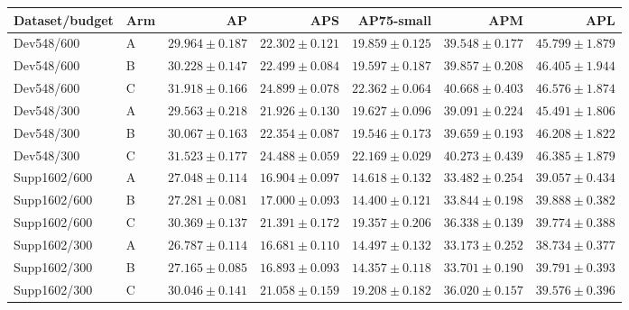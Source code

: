 \begin{tabular}{llrrrrr}
Dataset/budget & Arm & AP & APS & AP75-small & APM & APL \\
\hline
Dev548/600 & A & $29.964 \pm 0.187$ & $22.302 \pm 0.121$ & $19.859 \pm 0.125$ & $39.548 \pm 0.177$ & $45.799 \pm 1.879$ \\
Dev548/600 & B & $30.228 \pm 0.147$ & $22.499 \pm 0.084$ & $19.597 \pm 0.187$ & $39.857 \pm 0.208$ & $46.405 \pm 1.944$ \\
Dev548/600 & C & $31.918 \pm 0.166$ & $24.899 \pm 0.078$ & $22.362 \pm 0.064$ & $40.668 \pm 0.403$ & $46.576 \pm 1.874$ \\
Dev548/300 & A & $29.563 \pm 0.218$ & $21.926 \pm 0.130$ & $19.627 \pm 0.096$ & $39.091 \pm 0.224$ & $45.491 \pm 1.806$ \\
Dev548/300 & B & $30.067 \pm 0.163$ & $22.354 \pm 0.087$ & $19.546 \pm 0.173$ & $39.659 \pm 0.193$ & $46.208 \pm 1.822$ \\
Dev548/300 & C & $31.523 \pm 0.177$ & $24.488 \pm 0.059$ & $22.169 \pm 0.029$ & $40.273 \pm 0.439$ & $46.385 \pm 1.879$ \\
Supp1602/600 & A & $27.048 \pm 0.114$ & $16.904 \pm 0.097$ & $14.618 \pm 0.132$ & $33.482 \pm 0.254$ & $39.057 \pm 0.434$ \\
Supp1602/600 & B & $27.281 \pm 0.081$ & $17.000 \pm 0.093$ & $14.400 \pm 0.121$ & $33.844 \pm 0.198$ & $39.888 \pm 0.382$ \\
Supp1602/600 & C & $30.369 \pm 0.137$ & $21.391 \pm 0.172$ & $19.357 \pm 0.206$ & $36.338 \pm 0.139$ & $39.774 \pm 0.388$ \\
Supp1602/300 & A & $26.787 \pm 0.114$ & $16.681 \pm 0.110$ & $14.497 \pm 0.132$ & $33.173 \pm 0.252$ & $38.734 \pm 0.377$ \\
Supp1602/300 & B & $27.165 \pm 0.085$ & $16.893 \pm 0.093$ & $14.357 \pm 0.118$ & $33.701 \pm 0.190$ & $39.791 \pm 0.393$ \\
Supp1602/300 & C & $30.046 \pm 0.141$ & $21.058 \pm 0.159$ & $19.208 \pm 0.182$ & $36.020 \pm 0.157$ & $39.576 \pm 0.396$ \\
\end{tabular}
